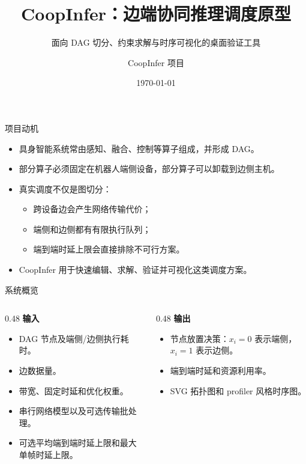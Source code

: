 \documentclass[aspectratio=169]{ctexbeamer}
\title[CoopInfer]{CoopInfer：边端协同推理调度原型}
\subtitle{面向 DAG 切分、约束求解与时序可视化的桌面验证工具}
\author{CoopInfer 项目}
\date{\today}
\begin{document}
\begin{frame}
  \titlepage
\end{frame}

\begin{frame}{项目动机}
  \begin{itemize}
    \item 具身智能系统常由感知、融合、控制等算子组成，并形成 DAG。
    \item 部分算子必须固定在机器人端侧设备，部分算子可以卸载到边侧主机。
    \item 真实调度不仅是图切分：
      \begin{itemize}
        \item 跨设备边会产生网络传输代价；
        \item 端侧和边侧都有有限执行队列；
        \item 端到端时延上限会直接排除不可行方案。
      \end{itemize}
    \item CoopInfer 用于快速编辑、求解、验证并可视化这类调度方案。
  \end{itemize}
\end{frame}

\begin{frame}{系统概览}
  \begin{columns}[T,onlytextwidth]
    \begin{column}{0.48\textwidth}
      \textbf{输入}
      \begin{itemize}
        \item DAG 节点及端侧/边侧执行耗时。
        \item 边数据量。
        \item 带宽、固定时延和优化权重。
        \item 串行网络模型以及可选传输批处理。
        \item 可选平均端到端时延上限和最大单帧时延上限。
      \end{itemize}
    \end{column}
    \begin{column}{0.48\textwidth}
      \textbf{输出}
      \begin{itemize}
        \item 节点放置决策：$x_i=0$ 表示端侧，$x_i=1$ 表示边侧。
        \item 端到端时延和资源利用率。
        \item SVG 拓扑图和 profiler 风格时序图。
      \end{itemize}
    \end{column}
  \end{columns}
\end{frame}
\end{document}
